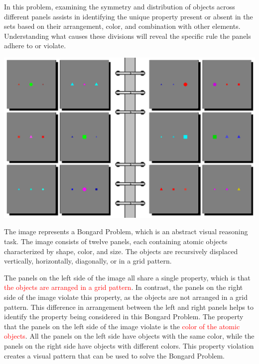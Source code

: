 \begin{tcolorbox}[breakable,enhanced jigsaw,opacityback=0,]
\begin{dialogue}
		In this problem, examining the symmetry and distribution of objects across different panels assists in identifying the unique property present or absent in the sets based on their arrangement, color, and combination with other elements. Understanding what causes these divisions will reveal the specific rule the panels adhere to or violate.
	\end{dialogue}
	\label{fig:task13-bongard}
\end{tcolorbox}




\begin{tcolorbox}[breakable,enhanced jigsaw,opacityback=0,]
	\centering
	\includegraphics[width=.8\linewidth]{imgs/bongard/easy-14.png}\\
	\begin{dialogue}
		 The image represents a Bongard Problem, which is an abstract visual reasoning task. The image consists of twelve panels, each containing atomic objects characterized by shape, color, and size. The objects are recursively displaced vertically, horizontally, diagonally, or in a grid pattern.
		
		The panels on the left side of the image all share a single property, which is that \textcolor{red}{the objects are arranged in a grid pattern}. In contrast, the panels on the right side of the image violate this property, as the objects are not arranged in a grid pattern. This difference in arrangement between the left and right panels helps to identify the property being considered in this Bongard Problem.
		\vspace{1em}
		 The property that the panels on the left side of the image violate is the \textcolor{red}{color of the atomic objects}. All the panels on the left side have objects with the same color, while the panels on the right side have objects with different colors. This property violation creates a visual pattern that can be used to solve the Bongard Problem.
		

\end{dialogue}
\end{tcolorbox}
